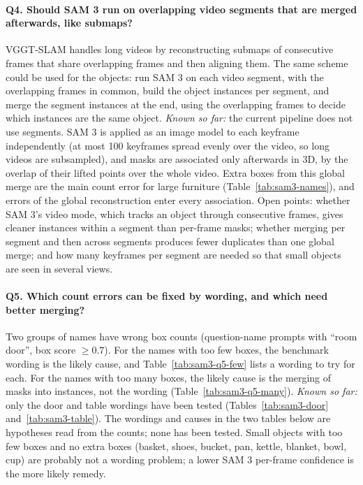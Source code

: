 \paragraph{Q4. Should SAM 3 run on overlapping video segments that are merged afterwards, like submaps?}
VGGT-SLAM handles long videos by reconstructing submaps of consecutive frames that share overlapping frames and
then aligning them. The same scheme could be used for the objects: run SAM 3 on each video segment, with the
overlapping frames in common, build the object instances per segment, and merge the segment instances at the end,
using the overlapping frames to decide which instances are the same object.
\emph{Known so far:} the current pipeline does not use segments. SAM 3 is applied as an image model to each
keyframe independently (at most 100 keyframes spread evenly over the video, so long videos are subsampled), and
masks are associated only afterwards in 3D, by the overlap of their lifted points over the whole video. Extra
boxes from this global merge are the main count error for large furniture (Table~\ref{tab:sam3-names}), and
errors of the global reconstruction enter every association. Open points: whether SAM 3's video mode, which
tracks an object through consecutive frames, gives cleaner instances within a segment than per-frame masks;
whether merging per segment and then across segments produces fewer duplicates than one global merge; and how
many keyframes per segment are needed so that small objects are seen in several views.

\paragraph{Q5. Which count errors can be fixed by wording, and which need better merging?}
Two groups of names have wrong box counts (question-name prompts with ``room door'', box score $\geq 0.7$).
For the names with too few boxes, the benchmark wording is the likely cause, and
Table~\ref{tab:sam3-q5-few} lists a wording to try for each. For the names with too many boxes, the likely
cause is the merging of masks into instances, not the wording (Table~\ref{tab:sam3-q5-many}).
\emph{Known so far:} only the door and table wordings have been tested
(Tables~\ref{tab:sam3-door} and~\ref{tab:sam3-table}). The wordings and causes in the two tables below are
hypotheses read from the counts; none has been tested. Small objects with too few boxes and no extra boxes
(basket, shoes, bucket, pan, kettle, blanket, bowl, cup) are probably not a wording problem; a lower SAM 3
per-frame confidence is the more likely remedy.

